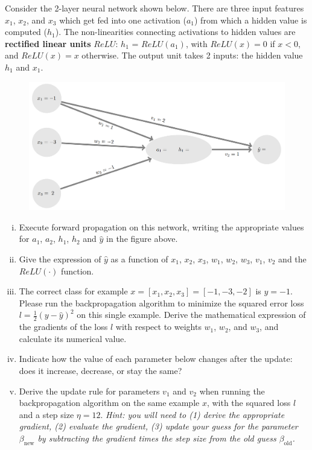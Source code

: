 \documentclass[11pt]{article}
\begin{document}
\begin{enumerate}
Consider the 2-layer neural network shown below. There are three input features $x_1$, $x_2$, and $x_3$ which get fed into one activation ($a_1$) from which a hidden value is computed ($h_1$). The non-linearities connecting activations to hidden values are \textbf{rectified linear units} $ReLU$: $h_1$ = $ReLU(a_1)$, with $ReLU(x) = 0$ if $x < 0$, and $ReLU(x) = x$ otherwise. The output unit takes 2 inputs: the hidden value $h_1$ and $x_1$.

\begin{figure}[htbp]
 \centerline{\includegraphics[scale=0.35]{grad_example.png}}
 \label{fig:backprop}
\end{figure}

\begin{enumerate}[(i) ]
    \item Execute forward propagation on this network, writing the appropriate values for $a_1$, $a_2$, $h_1$, $h_2$ and $\hat{y}$ in the figure above.
    \item Give the expression of $\hat{y}$ as a function of $x_1$, $x_2$, $x_3$, $w_1$, $w_2$, $w_3$, $v_1$, $v_2$ and the $ReLU(\cdot)$ function.
    \item The correct class for example $x = [x_1, x_2, x_3] = [-1, -3, -2]$ is $y = -1$. Please run the backpropagation algorithm to minimize the squared error loss $l = \frac{1}{2}(y - \hat{y})^2$ on this single example. Derive the mathematical expression of the gradients of the loss $l$ with respect to weights $w_1$, $w_2$, and $w_3$, and calculate its numerical value.
    \item Indicate how the value of each parameter below changes after the update: does it increase, decrease, or stay the same?
    \item Derive the update rule for parameters $v_1$ and $v_2$ when running the backpropagation algorithm on the same example $x$, with the squared loss $l$ and a step size $\eta = {1}{2}$. \textit{Hint: you will need to (1) derive the appropriate gradient, (2) evaluate the gradient, (3) update your guess for the parameter $\beta_{\text{new}}$ by subtracting the gradient times the step size from the old guess $\beta_{\text{old}}$.}
\end{enumerate}


\end{enumerate}
\end{document}
